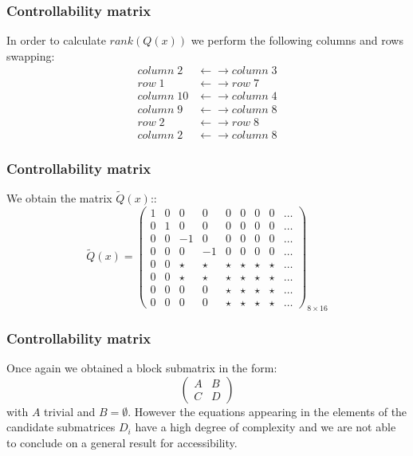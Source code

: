 %
\begin{frame}
\frametitle{Controllability matrix}
In order to calculate $rank(Q(x))$ we perform the following columns and rows swapping:
\begin{align*}
	column\;2 &\leftarrow\rightarrow column\;3 \\
	row\;1 &\leftarrow\rightarrow row\;7 \\
	column\;10 &\leftarrow\rightarrow column\;4 \\
	column\;9 &\leftarrow\rightarrow column\;8 \\
	row\;2 &\leftarrow\rightarrow row\;8 \\
	column\;2 &\leftarrow\rightarrow column\;8
\end{align*}
\end{frame}
%
\begin{frame}
\frametitle{Controllability matrix}
We obtain the matrix $\tilde{Q}(x)$::\\[10pt]
\begin{equation}
	\tilde{Q}(x)=%
	\begin{pmatrix}
		1 &0     &0     &0     &0     &0     &0     &0     &\dots \\
		0 &1     &0     &0     &0     &0     &0     &0     &\dots \\
		0 &0     &-1    &0     &0     &0     &0     &0     &\dots \\
		0 &0     &0     &-1    &0     &0     &0     &0     &\dots \\
		0 &0     &\star &\star &\star &\star &\star &\star &\dots \\
		0 &0     &\star &\star &\star &\star &\star &\star &\dots \\
		0 &0     &0     &0     &\star &\star &\star &\star &\dots \\
		0 &0     &0     &0     &\star &\star &\star &\star &\dots
	\end{pmatrix}_{8\times16}
\end{equation}
\end{frame}
%
\begin{frame}
	\frametitle{Controllability matrix}
Once again we obtained a block submatrix in the form:
\[
\begin{pmatrix}
	A &B\\
	C &D
\end{pmatrix}
\]
with $A$ trivial and $B=\emptyset$. However the equations appearing in the elements of the candidate submatrices $D_i$ have a high degree of complexity and we are not able to conclude on a general result for accessibility.\\[4pt]
\end{frame}
